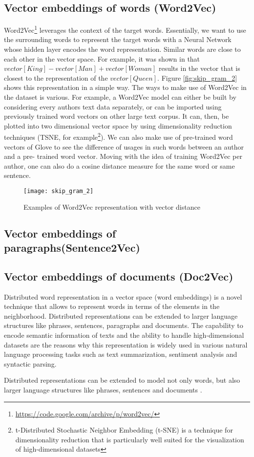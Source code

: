 \subsection{Vector embeddings of words (Word2Vec)}
Word2Vec\footnote{\url{https://code.google.com/archive/p/word2vec/}} leverages the context of the target words. Essentially, we want to use the surrounding words to represent the target words with a Neural Network whose hidden layer encodes the word representation.
Similar words are close
to each other in the vector space. For example, it was shown in \cite{mikolov2013linguistic} that $vector[King] - vector[Man] + vector[Woman]$ results in the vector that is closest to the representation of the $vector[Queen]$.
Figure \ref{fig:skip_gram_2} shows this representation in a simple way.
The ways to make use of Word2Vec in the dataset is various.
For example, a Word2Vec model can either be built by considering every authors
text data separately, or can be imported using previously trained word vectors on
other large text corpus. It can, then, be plotted into two dimensional vector space
by using dimensionality reduction techniques (TSNE, for example\footnote{t-Distributed Stochastic Neighbor Embedding (t-SNE) is a technique for dimensionality reduction that is particularly well suited for the visualization of high-dimensional datasets}). 
We can also make use of pre-trained word vectors of
Glove to see the difference of usages in such words between an author and a pre-
trained word vector.
Moving with the idea of training Word2Vec per author, one can also do a cosine
distance measure for the same word or same sentence.

\begin{figure}[ht]
	\centering
	\texttt{[image: skip\_gram\_2]}
	\caption[Word2Vec]{Examples of Word2Vec representation with vector distance}
	\label{fig:skipgram}
\end{figure}

\subsection{Vector embeddings of paragraphs(Sentence2Vec)}

\subsection{Vector embeddings of documents (Doc2Vec)}

Distributed word representation in a vector space (word embeddings) is a novel technique that allows to represent words in terms of the elements in the neighborhood.
Distributed representations can be extended to larger language structures like phrases, sentences, paragraphs and documents. The capability to encode semantic information of texts and the ability to handle high-dimensional datasets are the reasons why this representation is widely used in various natural language processing tasks such as text summarization, sentiment analysis and syntactic parsing.

Distributed representations can be extended to model not only words, but also larger language structures like phrases, sentences and documents \cite{le2014distributed}.